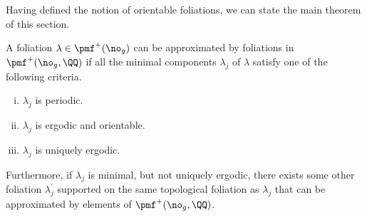\documentclass[12pt, reqno]{amsart}
\begin{document}
Having defined the notion of orientable foliations, we can state the main theorem of this section.
\begin{theorem}
  \label{thm:rational-approximation}
  A foliation $\lambda \in \pmf^+(\no_g)$ can be approximated by foliations in $\pmf^+(\no_g, \QQ)$ if all the minimal components $\lambda_j$ of $\lambda$ satisfy one of the following criteria.
  \begin{enumerate}[(i)]
  \item $\lambda_j$ is periodic.
  \item $\lambda_j$ is ergodic and orientable.
  \item $\lambda_j$ is uniquely ergodic.
  \end{enumerate}
  Furthermore, if $\lambda_j$ is minimal, but not uniquely ergodic, there exists some other foliation $\lambda_j^{\prime}$ supported on the same topological foliation as $\lambda_j$ that can be approximated by elements of $\pmf^+(\no_g, \QQ)$.
\end{theorem}
\end{document}
